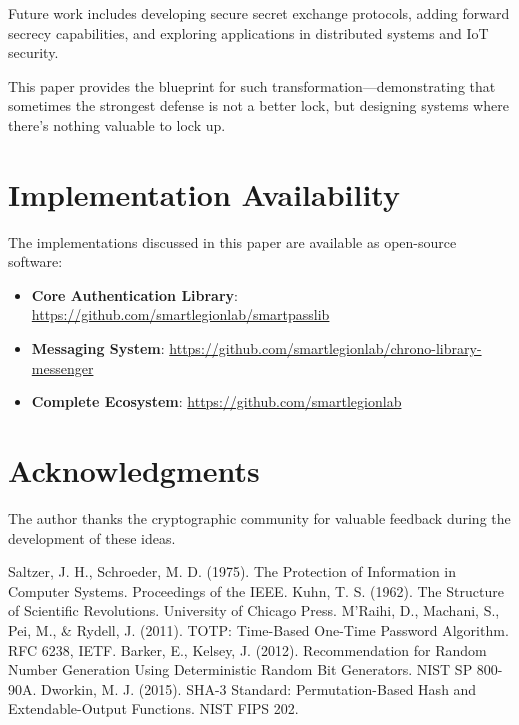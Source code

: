 \documentclass[11pt,a4paper]{article}
\begin{document}
Future work includes developing secure secret exchange protocols, adding forward secrecy capabilities, and exploring applications in distributed systems and IoT security.

This paper provides the blueprint for such transformation—demonstrating that sometimes the strongest defense is not a better lock, but designing systems where there's nothing valuable to lock up.

\section*{Implementation Availability}

The implementations discussed in this paper are available as open-source software:

\begin{itemize}
    \item \textbf{Core Authentication Library}: \url{https://github.com/smartlegionlab/smartpasslib}
    \item \textbf{Messaging System}: \url{https://github.com/smartlegionlab/chrono-library-messenger}
    \item \textbf{Complete Ecosystem}: \url{https://github.com/smartlegionlab}
\end{itemize}

\section*{Acknowledgments}

The author thanks the cryptographic community for valuable feedback during the development of these ideas.

\begin{thebibliography}{9}
 Saltzer, J. H., Schroeder, M. D. (1975). The Protection of Information in Computer Systems. Proceedings of the IEEE.
 Kuhn, T. S. (1962). The Structure of Scientific Revolutions. University of Chicago Press.
 M'Raihi, D., Machani, S., Pei, M., \& Rydell, J. (2011). TOTP: Time-Based One-Time Password Algorithm. RFC 6238, IETF.
 Barker, E., Kelsey, J. (2012). Recommendation for Random Number Generation Using Deterministic Random Bit Generators. NIST SP 800-90A.
 Dworkin, M. J. (2015). SHA-3 Standard: Permutation-Based Hash and Extendable-Output Functions. NIST FIPS 202.
\end{thebibliography}
\end{document}

